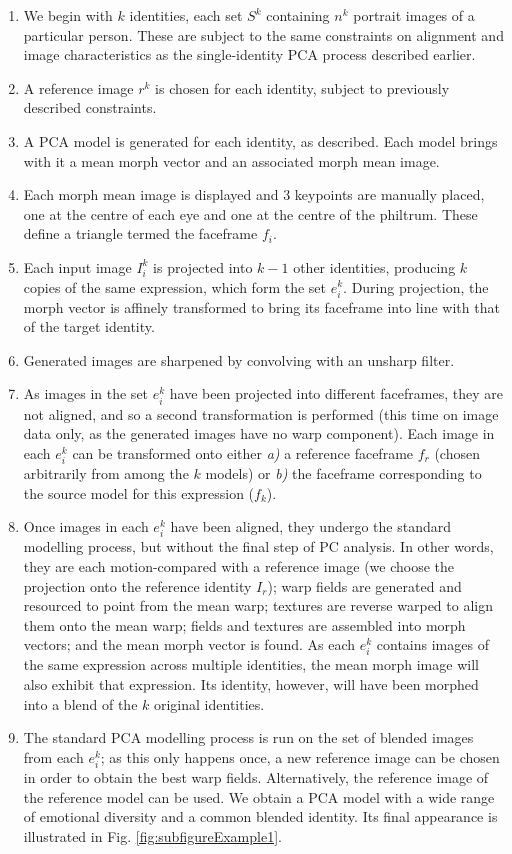 \documentclass[runningheads]{llncs}
\begin{document}
\begin{enumerate}


\item	We begin with $k$ identities, each set $S^k$ containing $n^k$ portrait images of a particular person. These are subject to the same constraints on alignment and image characteristics as the single-identity PCA process described earlier.
\item	A reference image $r^k$ is chosen for each identity, subject to previously described constraints.
\item	A PCA model is generated for each identity, as described. Each  model brings with it a mean morph vector and an associated morph mean image.
\item	Each morph mean image is displayed and 3 keypoints are manually placed, one at the centre of each eye and one at the centre of the philtrum. These define a triangle termed the faceframe $f_i$.
\item Each input image $I^k_i$ is projected into $k-1$ other identities, producing $k$ copies of the same expression, which form the set $e^k_i$. During projection, the morph vector is affinely transformed to bring its faceframe into line with that of the target identity.
\item	Generated images are sharpened by convolving with an unsharp filter\cite{polesel2000image}.
\item	As images in the set $e^k_i$ have been projected into different faceframes, they are not aligned, and so a second transformation is performed (this time on image data only, as the generated images have no warp component). Each image in each $e^k_i$ can be transformed onto either \textit{a)} a reference faceframe $f_r$ (chosen arbitrarily from among the $k$ models) or \textit{b)} the faceframe corresponding to the source model for this expression ($f_k$).
\item	Once images in each $e^k_i$ have been aligned, they undergo the standard modelling process, but without the final step of PC analysis. In other words, they are each motion-compared with a reference image (we choose the projection onto the reference identity $I_r$); warp fields are generated and resourced to point from the mean warp; textures are reverse warped to align them onto the mean warp; fields and textures are assembled into morph vectors; and the mean morph vector is found. As each $e^k_i$ contains images of the same expression across multiple identities, the mean morph image will also exhibit that expression. Its identity, however, will have been morphed into a blend of the $k$ original identities.
\item The standard PCA modelling process is run on the set of blended images from each $e^k_i$; as this only happens once, a new reference image can be chosen in order to obtain the best warp fields. Alternatively, the reference image of the reference model can be used. We obtain a PCA model with a wide range of emotional diversity and a common blended identity. Its final appearance is illustrated in Fig. \ref{fig:subfigureExample1}.

\end{enumerate}
\end{document}
